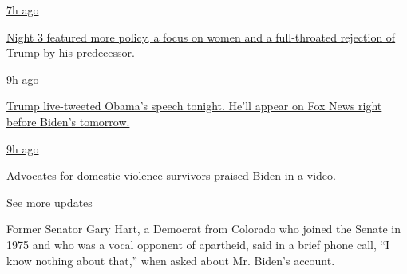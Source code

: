 \href{https://www.nytimes3xbfgragh.onion/live/2020/08/19/us/dnc-convention-election?action=click\&pgtype=Article\&state=default\&region=MAIN_CONTENT_1\&context=storylines_live_updates\#night-3-featured-more-policy-a-focus-on-women-and-a-full-throated-rejection-of-trump-by-his-predecessor}{7h
ago}

\href{https://www.nytimes3xbfgragh.onion/live/2020/08/19/us/dnc-convention-election?action=click\&pgtype=Article\&state=default\&region=MAIN_CONTENT_1\&context=storylines_live_updates\#night-3-featured-more-policy-a-focus-on-women-and-a-full-throated-rejection-of-trump-by-his-predecessor}{Night
3 featured more policy, a focus on women and a full-throated rejection
of Trump by his predecessor.}

\href{https://www.nytimes3xbfgragh.onion/live/2020/08/19/us/dnc-convention-election?action=click\&pgtype=Article\&state=default\&region=MAIN_CONTENT_1\&context=storylines_live_updates\#trump-live-tweeted-obamas-speech-tonight-hell-appear-on-fox-news-right-before-bidens-tomorrow}{9h
ago}

\href{https://www.nytimes3xbfgragh.onion/live/2020/08/19/us/dnc-convention-election?action=click\&pgtype=Article\&state=default\&region=MAIN_CONTENT_1\&context=storylines_live_updates\#trump-live-tweeted-obamas-speech-tonight-hell-appear-on-fox-news-right-before-bidens-tomorrow}{Trump
live-tweeted Obama's speech tonight. He'll appear on Fox News right
before Biden's tomorrow.}

\href{https://www.nytimes3xbfgragh.onion/live/2020/08/19/us/dnc-convention-election?action=click\&pgtype=Article\&state=default\&region=MAIN_CONTENT_1\&context=storylines_live_updates\#advocates-for-domestic-violence-survivors-praised-biden-in-a-video}{9h
ago}

\href{https://www.nytimes3xbfgragh.onion/live/2020/08/19/us/dnc-convention-election?action=click\&pgtype=Article\&state=default\&region=MAIN_CONTENT_1\&context=storylines_live_updates\#advocates-for-domestic-violence-survivors-praised-biden-in-a-video}{Advocates
for domestic violence survivors praised Biden in a video.}

\href{https://www.nytimes3xbfgragh.onion/live/2020/08/19/us/dnc-convention-election?action=click\&pgtype=Article\&state=default\&region=MAIN_CONTENT_1\&context=storylines_live_updates}{See
more updates}

Former Senator Gary Hart, a Democrat from Colorado who joined the Senate
in 1975 and who was a vocal opponent of apartheid, said in a brief phone
call, ``I know nothing about that,'' when asked about Mr. Biden's
account.

